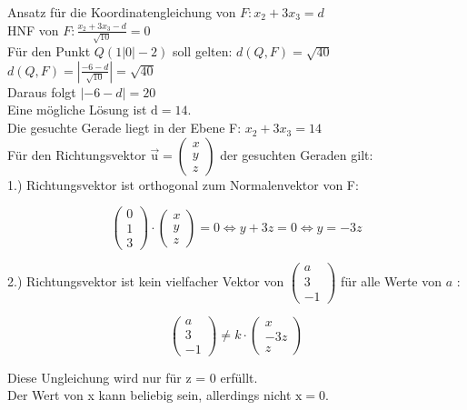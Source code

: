 \documentclass[10pt]{article}
\begin{document}
Ansatz für die Koordinatengleichung von $F: x_{2}+3 x_{3}=d$\\
HNF von $F: \frac{x_{2}+3 x_{3}-d}{\sqrt{10}}=0$\\
Für den Punkt $Q(1|0|-2)$ soll gelten: $d(Q, F)=\sqrt{40}$\\
$d(Q, F)=\left|\frac{-6-d}{\sqrt{10}}\right|=\sqrt{40}$\\
Daraus folgt $|-6-d|=20$\\
Eine mögliche Lösung ist $\mathrm{d}=14$.\\
Die gesuchte Gerade liegt in der Ebene F: $x_{2}+3 x_{3}=14$\\
Für den Richtungsvektor $\overrightarrow{\mathrm{u}}=\left(\begin{array}{l}x \\ y \\ z\end{array}\right)$ der gesuchten Geraden gilt:\\
1.) Richtungsvektor ist orthogonal zum Normalenvektor von F:

$$
\left(\begin{array}{l}
0 \\
1 \\
3
\end{array}\right) \cdot\left(\begin{array}{l}
x \\
y \\
z
\end{array}\right)=0 \Leftrightarrow y+3 z=0 \Leftrightarrow y=-3 z
$$

2.) Richtungsvektor ist kein vielfacher Vektor von $\left(\begin{array}{c}a \\ 3 \\ -1\end{array}\right)$ für alle Werte von $a$ :

$$
\left(\begin{array}{c}
a \\
3 \\
-1
\end{array}\right) \neq k \cdot\left(\begin{array}{c}
x \\
-3 z \\
z
\end{array}\right)
$$

Diese Ungleichung wird nur für z = 0 erfüllt.\\
Der Wert von x kann beliebig sein, allerdings nicht $\mathrm{x}=0$.
\end{document}
